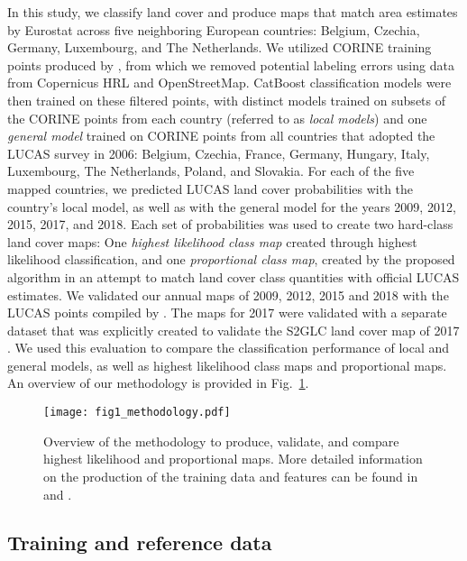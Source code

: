     In this study, we classify land cover and produce maps that match area estimates by Eurostat across five neighboring European countries: Belgium, Czechia, Germany, Luxembourg, and The Netherlands. We utilized CORINE training points produced by \citep{witjes2022spatiotemporal}, from which we removed potential labeling errors using data from Copernicus HRL and OpenStreetMap. CatBoost classification models were then trained on these filtered points, with distinct models trained on subsets of the CORINE points from each country (referred to as \emph{local models}) and one \emph{general model} trained on CORINE points from all countries that adopted the LUCAS survey in 2006: Belgium, Czechia, France, Germany, Hungary, Italy, Luxembourg, The Netherlands, Poland, and Slovakia. For each of the five mapped countries, we predicted LUCAS land cover probabilities with the country's local model, as well as with the general model for the years 2009, 2012, 2015, 2017, and 2018. Each set of probabilities was used to create two hard-class land cover maps: One \emph{highest likelihood class map} created through highest likelihood classification, and one \emph{proportional class map}, created by the proposed algorithm in an attempt to match land cover class quantities with official LUCAS estimates. We validated our annual maps of 2009, 2012, 2015 and 2018 with the LUCAS points compiled by \citep{dandrimont2020harmonised}. The maps for 2017 were validated with a separate dataset that was explicitly created to validate the S2GLC land cover map of 2017 \citep{jenerowicz2021validation}. We used this evaluation to compare the classification performance of local and  general models, as well as highest likelihood class maps and proportional maps. An overview of our methodology is provided in Fig.~\ref{fig:workflow}.

    \begin{figure}
    \centering
    \texttt{[image: fig1\_methodology.pdf]}
    \caption{Overview of the methodology to produce, validate, and compare highest likelihood and proportional maps. More detailed information on the production of the training data and features can be found in \citep{witjes2022spatiotemporal} and \citep{witjes2023ecodatacube}.}
    \label{fig:workflow}
    \end{figure}
    
    \subsection{Training and reference data}
    
